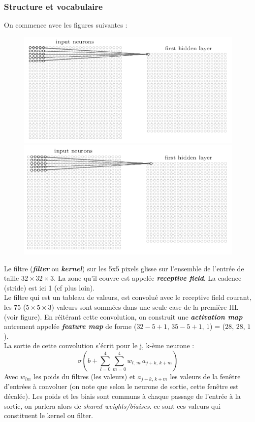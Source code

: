\documentclass[a4paper,12pt]{report}
\newcommand\bk{\color{black}}
\newcommand\navy{\color{navy}}
\numberwithin{equation}{section} %
\begin{document}
\navy \subsubsection{Structure et vocabulaire} \bk
On commence avec les figures suivantes :
\begin{figure}[!ht]
\centering
\includegraphics[scale=0.43]{5x5_1.png} \hfill
\includegraphics[scale=0.43]{5x5_2.png} 

\end{figure}
Le filtre (\textit{\textbf{filter}} ou \textit{\textbf{kernel}}) sur les 5x5 pixels glisse sur l'ensemble de l'entrée de taille $32\times32\times3$. La zone qu'il couvre est appelée \textbf{\textit{receptive field}}. La cadence (stride) est ici 1 (cf plus loin).\\
Le filtre qui est un tableau de valeurs, est convolué avec le receptive field courant, les 75 ($5\times5\times3$) valeurs sont sommées dans une seule case de la première HL (voir figure). En réitérant cette convolution, on construit une \textit{\textbf{activation map}} autrement appelée \textit{\textbf{feature map}} de forme ($32-5+1$, $35-5+1$, $1$) = ($28$, $28$, $1$). \\
La sortie de cette convolution s'écrit pour le j, k-ème neurone :
\begin{equation*}
\sigma \left( b + \sum^4_{l=0}\sum^4_{m=0} w_{l,\,m} \, a_{j+k,\, k+m} \right)
\end{equation*}
Avec $w_{lm}$ les poids du filtres (les valeurs) et $a_{j+k,\, k+m}$ les valeurs de la fenêtre d'entrées à convoluer (on note que selon le neurone de sortie, cette fenêtre est décalée). Les poids et les biais sont communs à chaque passage de l'entrée à la sortie, on parlera alors de \textit{shared weights/biaises}. ce sont ces valeurs qui constituent le kernel ou filter.\\
\end{document}
